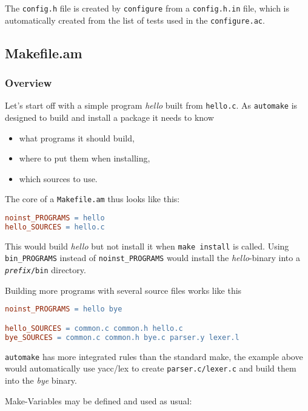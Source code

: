\documentclass[11pt,a4paper,headinclude,footinclude,DIV16,normalheadings]{scrartcl}
\newcommand{\automake}{\texttt{automake}\xspace}
\newcommand{\configure}{\texttt{configure}\xspace}
\newcommand{\configureac}{\texttt{configure.ac}\xspace}
\newcommand{\makefileam}{\texttt{Makefile.am}\xspace}
\newcommand{\executable}[1]{{\em #1}\xspace}
\begin{document}
The \texttt{config.h} file is created by \configure from a
\texttt{config.h.in} file, which is automatically created from the
list of tests used in the \configureac.

\subsection{Makefile.am}
\label{makefile.am}

\subsubsection{Overview}

Let's start off with a simple program \executable{hello} built from
\texttt{hello.c}. As \automake is designed to build and install a
package it needs to know

\begin{itemize}
\item what programs it should build,
\item where to put them when installing,
\item which sources to use.
\end{itemize}

The core of a \makefileam thus looks like this:

\begin{lstlisting}[language=make]
noinst_PROGRAMS = hello
hello_SOURCES = hello.c
\end{lstlisting}

This would build \executable{hello} but not install it when \texttt{make
  install} is called. Using \verb!bin_PROGRAMS! instead of
\verb!noinst_PROGRAMS! would install the \executable{hello}-binary into a
\texttt{\textit{prefix}/bin} directory.

Building more programs with several source files works like this

\begin{lstlisting}[language=make]
noinst_PROGRAMS = hello bye

hello_SOURCES = common.c common.h hello.c
bye_SOURCES = common.c common.h bye.c parser.y lexer.l
\end{lstlisting}

\automake has more integrated rules than the standard make, the example
above would automatically use yacc/lex to create
\texttt{parser.c/lexer.c} and build them into the {\em bye} binary.

Make-Variables may be defined and used as usual:
\end{document}
